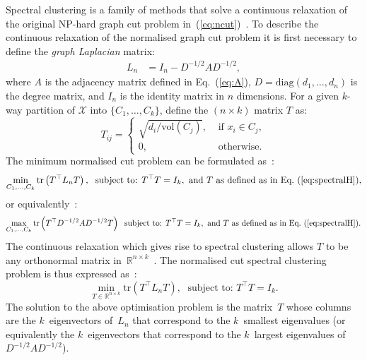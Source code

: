 \documentclass{book}
\def\R{\mathbb{R}}
\def\tr#1{\mathrm{tr}\left(#1\right)}
\begin{document}
Spectral clustering is a family of methods that solve a continuous relaxation
of the original NP-hard graph cut problem in~(\ref{eq:ncut})~\cite{HagenK1992,ShiM2000,Luxburg2007}. 
%
To describe the continuous relaxation of the normalised graph cut problem it is first necessary to
define the \emph{graph Laplacian} matrix:
%
\begin{align*}
%
L_n &= I_n - D^{-1/2}AD^{-1/2},
%
\end{align*} 
where $A$ is the adjacency matrix defined in Eq.~(\ref{eq:A}),
$D = \textrm{diag}(d_1,\ldots,d_n)$ is the degree matrix, and $I_n$ is the identity matrix
in $n$ dimensions.
%
For a given $k$-way partition of $\mathcal{X}$ into $\{C_1,\ldots,C_k\}$, define the $(n \times k)$ matrix
$T$ as:
%
\begin{equation}\label{eq:spectralH}
%
T_{ij} = \left\{ \begin{array}{ll} \sqrt{d_i/ \mathrm{vol}(C_j)}, & \textrm{ if } x_i \in C_j, \\
	0, & \textrm{ otherwise}. \end{array} \right.
%
\end{equation}
The minimum normalised cut problem can be formulated as~\cite{ShiM2000}:
%
\[
%
\min_{C_1,\ldots,C_k} \tr{T^\top L_n T}, \; \textrm{ subject to: } T^\top T = I_k, 
	\textrm{ and } T \textrm{ as defined as in Eq.~(\ref{eq:spectralH})},
%
\]
%
or equivalently~\cite{NgJW2001}:
\[
%
\max_{C_1,\ldots,C_k} \tr{T^\top D^{-1/2} A D^{-1/2} T} \; \textrm{ subject to: } T^\top T = I_k,
	\textrm{ and } T \textrm{ as defined as in Eq.~(\ref{eq:spectralH})}.
%
\]
%
The continuous relaxation which gives rise to spectral clustering 
allows $T$ to
be any orthonormal matrix in~$\R^{n \times k}$~\cite{Luxburg2007}. 
The normalised cut spectral clustering problem is thus expressed as~\cite{ShiM2000}:
\[
\min_{T \in \R^{n \times k}} \tr{T^\top L_n T}, \; \textrm{ subject to: } T^\top T = I_k.
\]
The solution to the above optimisation problem is the matrix~$T$ whose columns 
are the $k$~eigenvectors of~$L_n$ that correspond to the $k$~smallest
eigenvalues (or equivalently the $k$~eigenvectors that correspond to the $k$~largest
eigenvalues of $D^{-1/2} A D^{-1/2}$).
%
\end{document}
